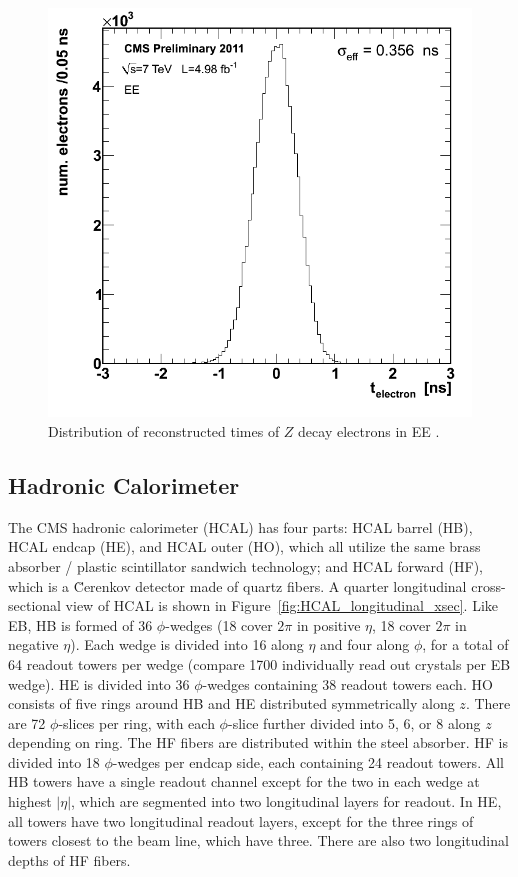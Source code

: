 \documentclass[dissertation.tex]{subfiles}
\begin{document}
\begin{figure}
	\centering
	\includegraphics[scale=0.3]{ECAL_timing_res}
	\caption{Distribution of reconstructed times of $Z$ decay electrons in EE \cite{ECAL_DPG_Twiki_timing_res}.}
	\label{fig:ECAL_timing_res}
\end{figure}

\subsection{Hadronic Calorimeter}

The CMS hadronic calorimeter (HCAL) has four parts: HCAL barrel (HB), HCAL endcap (HE), and HCAL outer (HO), which all utilize the same brass absorber / plastic scintillator sandwich technology; and HCAL forward (HF), which is a \u{C}erenkov detector made of quartz fibers.  A quarter longitudinal cross-sectional view of HCAL is shown in Figure~\ref{fig:HCAL_longitudinal_xsec}.  Like EB, HB is formed of 36 $\phi$-wedges (18 cover $2\pi$ in positive $\eta$, 18 cover $2\pi$ in negative $\eta$).  Each wedge is divided into 16 along $\eta$ and four along $\phi$, for a total of 64 readout towers per wedge (compare 1700 individually read out crystals per EB wedge).  HE is divided into 36 $\phi$-wedges containing 38 readout towers each.  HO consists of five rings around HB and HE distributed symmetrically along $z$.  There are 72 $\phi$-slices per ring, with each $\phi$-slice further divided into 5, 6, or 8 along $z$ depending on ring.  The HF fibers are distributed within the steel absorber.  HF is divided into 18 $\phi$-wedges per endcap side, each containing 24 readout towers.  All HB towers have a single readout channel except for the two in each wedge at highest $|\eta|$, which are segmented into two longitudinal layers for readout.  In HE, all towers have two longitudinal readout layers, except for the three rings of towers closest to the beam line, which have three.  There are also two longitudinal depths of HF fibers.
\end{document}
